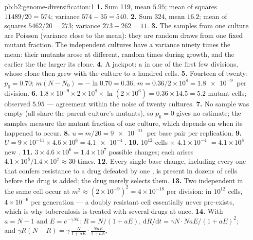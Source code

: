 \begin{solution}{pb:b2:genome-diversification:1}
\textbf{1.} Sum 119, mean $5.95$; mean of squares $11489/20 = 574$;
variance $574 - 35 = 540$.
\textbf{2.} Sum 324, mean $16.2$; mean of squares $5462/20 = 273$;
variance $273 - 262 = 11$.
\textbf{3.} The samples from one culture are Poisson (variance close
to the mean): they are random draws from one fixed mutant fraction.
The independent cultures have a variance ninety times the mean:
their mutants arose at different, random times during growth, and
the earlier the  the larger its clone.
\textbf{4.} A jackpot: a  in one of the first few divisions,
whose clone then grew with the culture to a hundred cells.
\textbf{5.} Fourteen of twenty: $p_0 = 0.70$; $m(N - N_0) = -\ln 0.70
= 0.36$; $m = 0.36/2\times 10^{8} = \qty{1.8e-9}{}$ per division.
\textbf{6.} $1.8\times 10^{-9}\times 2\times 10^{8}\times \ln(2\times
10^{6}) = 0.36\times 14.5 = 5.2$ mutant cells; observed $5.95$ ---
agreement within the noise of twenty cultures.
\textbf{7.} No sample was empty (all share the parent culture's
mutants), so $p_0 = 0$ gives no estimate; the samples measure the
mutant fraction of one culture, which depends on when its 
happened to occur.
\textbf{8.} $u = m/20 = \qty{9e-11}{}$ per base pair per replication.
\textbf{9.} $U = 9\times 10^{-11}\times 4.6\times 10^{6} =
\qty{4.1e-4}{}$.
\textbf{10.} $10^{12}$ cells $\times$ $4.1\times 10^{-4}$ $= 4.1\times
10^{8}$ new .
\textbf{11.} $3\times 4.6\times 10^{6} = 1.4\times 10^{7}$ possible
changes; each arises $4.1\times 10^{8}/1.4\times 10^{7} \approx 30$
times.
\textbf{12.} Every single-base change, including every one that
confers resistance to a drug defeated by one , is present in
dozens of cells before the drug is added; the drug merely selects
them.
\textbf{13.} Two independent  in the same cell occur at
$m^2 \approx (2\times 10^{-9})^2 = 4\times 10^{-18}$ per division: in
$10^{12}$ cells, $4\times 10^{-6}$ per generation --- a doubly
resistant cell essentially never pre-exists, which is why
tuberculosis is treated with several drugs at once.
\textbf{14.} With $a = N - 1$ and $E = e^{-\gamma Nt}$: $R = N/(1 +
aE)$, $\mathrm{d}R/\mathrm{d}t = \gamma N\cdot NaE/(1 + aE)^2$; and
$\gamma R(N - R) = \gamma\,\frac{N}{1 + aE}\cdot\frac{NaE}{1 + aE}$,

\end{solution}
